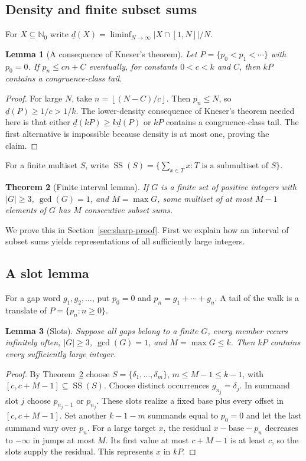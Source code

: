 \documentclass[11pt,a4paper,reqno]{amsart}
\newtheorem{theorem}{Theorem}[section]
\newtheorem{lemma}[theorem]{Lemma}
\theoremstyle{definition}
\theoremstyle{remark}
\newcommand{\NN}{\mathbb N}
\newcommand{\dd}{\underline d}
\newcommand{\ssum}{\operatorname{SS}}
\newcommand{\floor}[1]{\left\lfloor #1\right\rfloor}
\begin{document}
\subsection{Density and finite subset sums}
For $X\subseteq\NN_0$ write
$\dd(X)=\liminf_{N\to\infty}|X\cap[1,N]|/N$.
\begin{lemma}[A consequence of Kneser's theorem]\label{lem:density}
Let $P=\{p_0<p_1<\cdots\}$ with $p_0=0$. If $p_n\le cn+C$
eventually, for constants $0<c<k$ and $C$, then $kP$ contains a
congruence-class tail.
\end{lemma}
\begin{proof}
For large $N$, take $n=\floor{(N-C)/c}$. Then $p_n\le N$, so
$\dd(P)\ge1/c>1/k$. The lower-density consequence of Kneser's theorem
\cite{Kneser53,ENS88} needed here is that either $\dd(kP)\ge k\dd(P)$
or $kP$ contains a congruence-class tail. The first alternative is impossible
because density is at most one, proving the claim.
\end{proof}
For a finite multiset $S$, write
$\ssum(S)=\{\sum_{x\in T}x:T\text{ is a submultiset of }S\}$.
\begin{theorem}[Finite interval lemma]\label{thm:sharp}
If $G$ is a finite set of positive integers with $|G|\ge3$, $\gcd(G)=1$,
and $M=\max G$, some multiset of at most $M-1$ elements of $G$ has
$M$ consecutive subset sums.
\end{theorem}
We prove this in Section~\ref{sec:sharp-proof}. First we explain how an interval
of subset sums yields representations of all sufficiently large integers.
\subsection{A slot lemma}
For a gap word $g_1,g_2,\ldots$, put $p_0=0$ and
$p_n=g_1+\cdots+g_n$. A tail of the walk is a translate of $P=\{p_n:n\ge0\}$.
\begin{lemma}[Slots]\label{lem:slots}
Suppose all gaps belong to a finite $G$, every member recurs infinitely
often, $|G|\ge3$, $\gcd(G)=1$, and $M=\max G\le k$. Then $kP$
contains every sufficiently large integer.
\end{lemma}
\begin{proof}
By Theorem~\ref{thm:sharp} choose $S=\{\delta_1,\ldots,\delta_m\}$, $m\le M-1\le k-1$,
with $[c,c+M-1]\subseteq\ssum(S)$. Choose distinct occurrences
$g_{n_j}=\delta_j$. In summand slot $j$ choose $p_{n_j-1}$ or $p_{n_j}$.
These slots realize a fixed base plus every offset in $[c,c+M-1]$.
Set another $k-1-m$ summands equal to $p_0=0$ and let the last summand vary over $p_n$.
For a large target $x$, the residual $x-\mathrm{base}-p_n$ decreases to
$-\infty$ in jumps at most $M$. Its first value at most $c+M-1$ is at
least $c$, so the slots supply the residual. This represents $x$ in $kP$.
\end{proof}
\end{document}
